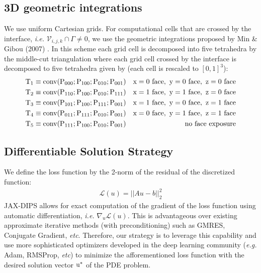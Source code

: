 \documentclass{elsarticle}
\begin{document}
\subsection{3D geometric integrations}
We use uniform Cartesian grids. For computational cells that are crossed by the interface, \textit{i.e.} $\mathcal{V}_{i,j,k}\cap \Gamma \neq 0$, we use the geometric integrations proposed by Min \& Gibou (2007) \cite{min2007geometric}. In this scheme each grid cell is decomposed into five tetrahedra by the middle-cut triangulation \cite{sallee1984middle} where each grid cell crossed by the interface is decomposed to five tetrahedra given by (each cell is rescaled to $[0,1]^3$):
\begin{align*}
        &\rm T_1 \equiv conv(P_{000} ; P_{100} ; P_{010} ; P_{001}) &\rm{ x = 0\ face,\ y = 0\ face,\ z = 0\ face} \\
        &\rm T_2 \equiv conv(P_{110} ; P_{100} ; P_{010} ; P_{111}) &\rm{ x = 1\ face,\ y = 1\ face,\ z = 0\ face} \\
        &\rm T_3 \equiv conv(P_{101} ; P_{100} ; P_{111} ; P_{001}) &\rm{ x = 1\ face,\ y = 0\ face,\ z = 1\ face} \\
        &\rm T_4 \equiv conv(P_{011} ; P_{111} ; P_{010} ; P_{001}) &\rm{ x = 0\ face,\ y = 1\ face,\ z = 1\ face} \\
        &\rm T_5\equiv conv(P_{111} ; P_{100} ; P_{010} ; P_{001}) &\rm{ no\ face\ exposure}
\end{align*}



\subsection{Differentiable Solution Strategy}

We define the loss function by the 2-norm of the residual of the discretized function:
\begin{align*}
\mathcal{L}(u) = \vert\vert Au - b\vert\vert_2^2
\end{align*}
JAX-DIPS allows for exact computation of the gradient of the loss function using automatic differentiation, \textit{i.e.} $\nabla_u \mathcal{L}(u)$. This is advantageous over existing approximate iterative methods (with preconditioning) such as GMRES, Conjugate Gradient, \textit{etc}. Therefore, our strategy is to leverage this capability and use more sophisticated optimizers developed in the deep learning community (\textit{e.g.} Adam, RMSProp, \textit{etc}) to minimize the afforementioned loss function with the desired solution vector $\rm u^\ast$ of the PDE problem.
\end{document}

